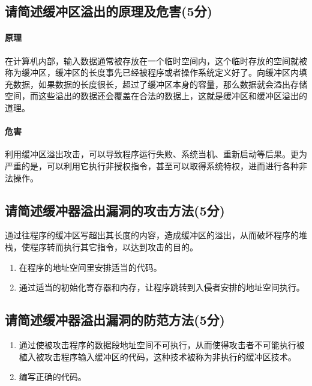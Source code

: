\subsection{请简述缓冲区溢出的原理及危害(5分)}
\paragraph{原理}在计算机内部，输入数据通常被存放在一个临时空间内，这个临时存放的空间就被称为缓冲区，缓冲区的长度事先已经被程序或者操作系统定义好了。向缓冲区内填充数据，如果数据的长度很长，超过了缓冲区本身的容量，那么数据就会溢出存储空间，而这些溢出的数据还会覆盖在合法的数据上，这就是缓冲区和缓冲区溢出的道理。

\paragraph{危害}利用缓冲区溢出攻击，可以导致程序运行失败、系统当机、重新启动等后果。更为严重的是，可以利用它执行非授权指令，甚至可以取得系统特权，进而进行各种非法操作。

\subsection{请简述缓冲器溢出漏洞的攻击方法(5分)}
通过往程序的缓冲区写超出其长度的内容，造成缓冲区的溢出，从而破坏程序的堆栈，使程序转而执行其它指令，以达到攻击的目的。

\begin{enumerate}
    \item 在程序的地址空间里安排适当的代码。
    \item 通过适当的初始化寄存器和内存，让程序跳转到入侵者安排的地址空间执行。
\end{enumerate}

\subsection{请简述缓冲器溢出漏洞的防范方法(5分)}

\begin{enumerate}
    \item 通过使被攻击程序的数据段地址空间不可执行，从而使得攻击者不可能执行被植入被攻击程序输入缓冲区的代码，这种技术被称为非执行的缓冲区技术。
    \item 编写正确的代码。
\end{enumerate}

